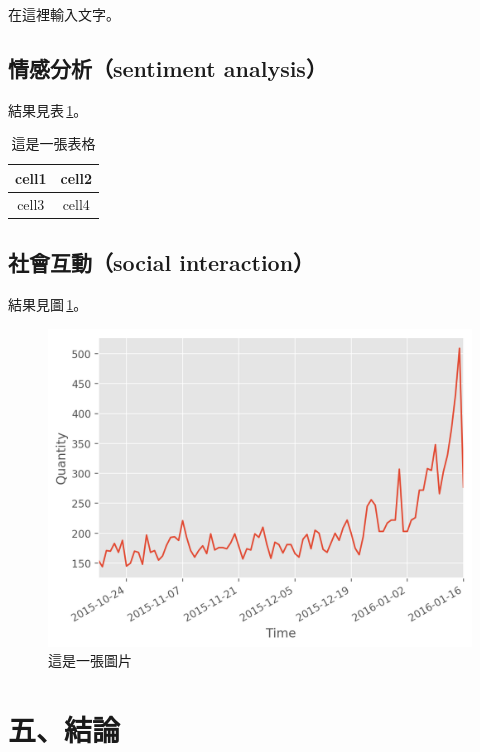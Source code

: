 \documentclass[letterpaper, 10pt, conference]{ieeeconf}   %
\begin{document}
\begin{CJK*}{UTF8}{bsmi}
在這裡輸入文字。

\subsection*{情感分析（sentiment analysis）}

結果見表\,\ref{t1}。

\begin{table}[!htbp]
\caption{這是一張表格}
\label{t1}
\begin{center}
\begin{tabular}{|c|c|}
\hline
cell1 & cell2 \\
\hline
cell3 & cell4 \\
\hline
\end{tabular}
\end{center}
\end{table}

\subsection*{社會互動（social interaction）}

結果見圖\,\ref{f1}。

\begin{figure}[!htbp]
\centering
\includegraphics[width=\columnwidth]{quantity_time_graph}
\caption{這是一張圖片}
\label{f1}
\end{figure}

\section*{五、結論}


\end{CJK*}
\end{document}
